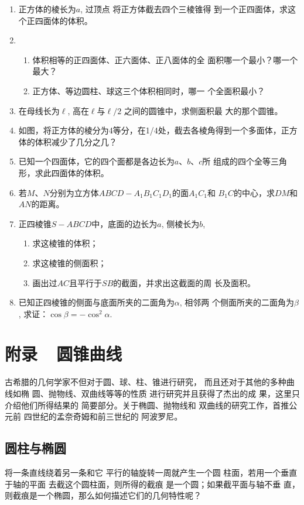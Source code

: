 \begin{enumerate}
\item 正方体的棱长为$a$, 过顶点
将正方体截去四个三棱锥得
到一个正四面体，求这个正四面体的体积。
\item \begin{enumerate}
    \item 体积相等的正四面体、正六面体、正八面体的全
    面积哪一个最小？哪一个最大？
    \item 正方体、等边圆柱、球这三个体积相同时，哪一
    个全面积最小？
\end{enumerate}
\item 在母线长为$\ell$, 高在$\ell$与$\ell/2$
之间的圆锥中，求侧面积最
大的那个圆锥。
\item 如图，将正方体的棱分为4等分，在1/4处，截去各棱角得到一个多面体，正方体的体积减少了几分之几？
\item 已知一个四面体，它的四个面都是各边长为$a$、$b$、$c$所
组成的四个全等三角形，求此四面体的体积。
\item 若$M$、$N$分别为立方体$ABCD-A_1B_1C_1D_1$的面$A_1C_1$和
$B_1C$的中心，求$DM$和$AN$的距离。
\item 正四棱锥$S-ABCD$中，底面的边长为$a$, 侧棱长为$b$,
\begin{enumerate}
    \item 求这棱锥的体积；
    \item 求这棱锥的侧面积；
    \item 画出过$AC$且平行于$SB$的截面，并求出这截面的周
长及面积。
\end{enumerate}

\item 已知正四棱锥的侧面与底面所夹的二面角为$\alpha$, 相邻两
个侧面所夹的二面角为$\beta$, 求证：$\cos\beta=-\cos^2\alpha$.
\end{enumerate}

\section{附录~~圆锥曲线}
古希腊的几何学家不但对于圆、球、柱、锥进行研究，
而且还对于其他的多种曲线如椭
圆、抛物线、双曲线等等的性质
进行研究并且获得了杰出的成
果，这里只介绍他们所得结果的
简要部分。关于椭圆、抛物线和
双曲线的研究工作，首推公元前
四世纪的孟奈奇姆和前三世纪的
阿波罗尼。

\subsection{圆柱与椭圆}
将一条直线绕着另一条和它
平行的轴旋转一周就产生一个圆
柱面，若用一个垂直于轴的平面
去截这个圆柱面，则所得的截痕
是一个圆；如果截平面与轴不垂
直，则截痕是一个椭圆，那么如何描述它们的几何特性呢？

